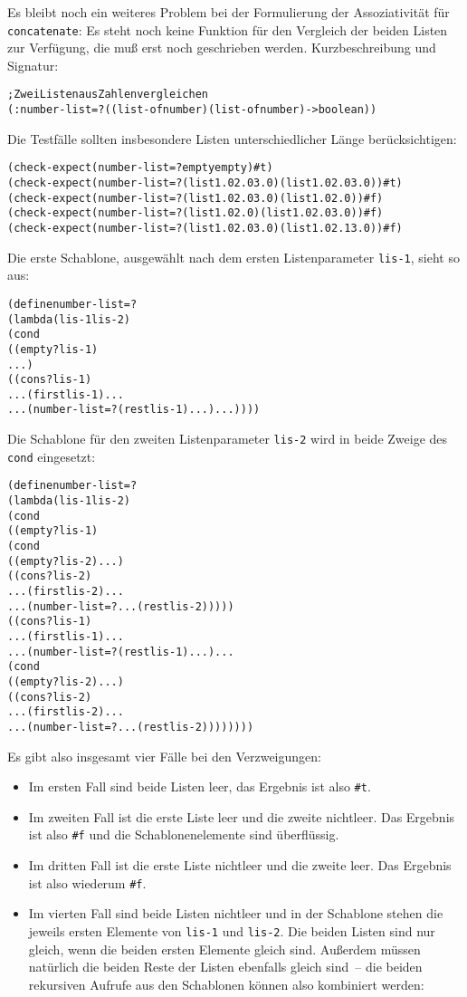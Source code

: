 Es bleibt noch ein weiteres Problem bei der Formulierung der
Assoziativität für \texttt{concatenate}: Es steht noch keine Funktion
für den Vergleich der beiden Listen zur Verfügung, die muß erst noch
geschrieben werden.  Kurzbeschreibung und Signatur:
%
\begin{alltt}
; Zwei Listen aus Zahlen vergleichen
(: number-list=? ((list-of number) (list-of number) -> boolean))
\end{alltt}
%
Die Testfälle sollten insbesondere Listen unterschiedlicher Länge
berücksichtigen:
%
\begin{alltt}
(check-expect (number-list=? empty empty) #t)
(check-expect (number-list=? (list 1.0 2.0 3.0) (list 1.0 2.0 3.0)) #t)
(check-expect (number-list=? (list 1.0 2.0 3.0) (list 1.0 2.0)) #f)
(check-expect (number-list=? (list 1.0 2.0) (list 1.0 2.0 3.0)) #f)
(check-expect (number-list=? (list 1.0 2.0 3.0) (list 1.0 2.1 3.0)) #f)
\end{alltt}
%
Die erste Schablone, ausgewählt nach dem ersten Listenparameter
\texttt{lis-1}, sieht so aus:
% 
\begin{alltt}
(define number-list=?
  (lambda (lis-1 lis-2)
    (cond
      ((empty? lis-1)
       ...)
      ((cons? lis-1)
       ... (first lis-1) ...
       ... (number-list=? (rest lis-1) ...) ...))))
\end{alltt}
%
Die Schablone für den zweiten Listenparameter \texttt{lis-2} wird in
beide Zweige des \texttt{cond} eingesetzt:
%
\begin{alltt}
(define number-list=?
  (lambda (lis-1 lis-2)
    (cond
      ((empty? lis-1)
       (cond
         ((empty? lis-2) ...)
         ((cons? lis-2)
          ... (first lis-2) ...
          ... (number-list=? ... (rest lis-2)))))
      ((cons? lis-1)
       ... (first lis-1) ...
       ... (number-list=? (rest lis-1) ...) ...
       (cond
         ((empty? lis-2) ...)
         ((cons? lis-2)
          ... (first lis-2) ...
          ... (number-list=? ... (rest lis-2))))))))
\end{alltt}
%
Es gibt also insgesamt vier Fälle bei den Verzweigungen:
\begin{itemize}
\item Im ersten
Fall sind beide Listen leer, das Ergebnis ist also \texttt{\#t}.
\item Im zweiten Fall ist die erste Liste leer und die zweite
  nichtleer.  Das Ergebnis ist also \texttt{\#f} und die
  Schablonenelemente sind überflüssig.
\item Im dritten Fall ist die erste Liste nichtleer und die zweite
  leer.  Das Ergebnis ist also wiederum \texttt{\#f}.
\item Im vierten Fall sind beide Listen nichtleer und in der Schablone
  stehen die jeweils ersten Elemente von \texttt{lis-1} und
  \texttt{lis-2}.  Die beiden Listen sind nur gleich, wenn die beiden
  ersten Elemente gleich sind.  Außerdem müssen natürlich die beiden
  Reste der Listen ebenfalls gleich sind~-- die beiden rekursiven
  Aufrufe aus den Schablonen können also kombiniert werden:
\end{itemize}
